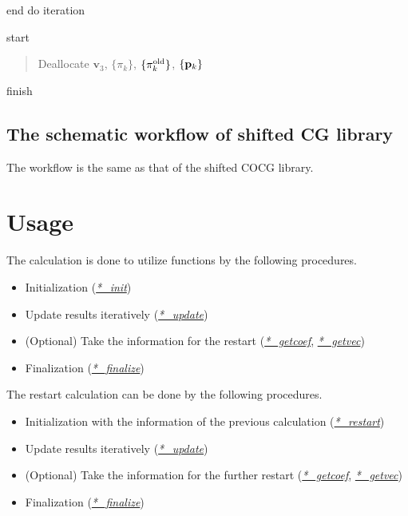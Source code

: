 \documentclass[letterpaper,10pt,dvipdfmx,openany]{sphinxmanual}
\begin{document}
end do iteration

 start
\begin{quote}

Deallocate \({\boldsymbol v}_3\), \(\{\pi_k\}\),
\(\{\pi_k^{\rm old}\}\), \(\{{\bf p}_k\}\)
\end{quote}

 finish


\section{The schematic workflow of shifted CG library}
\label{komega_workflow_en:the-schematic-workflow-of-shifted-cg-library}
The workflow is the same as that of the shifted COCG library.


\chapter{Usage}
\label{komega_usage_en:usage}\label{komega_usage_en::doc}
The calculation is done to utilize functions by the following
procedures.
\begin{itemize}
\item {} 
Initialization ({\hyperref[komega_usage_en:init]{\emph{*\_init}}})

\item {} 
Update results iteratively ({\hyperref[komega_usage_en:update]{\emph{*\_update}}})

\item {} 
(Optional) Take the information for the restart ({\hyperref[komega_usage_en:getcoef]{\emph{*\_getcoef}}}, {\hyperref[komega_usage_en:getvec]{\emph{*\_getvec}}})

\item {} 
Finalization ({\hyperref[komega_usage_en:finalize]{\emph{*\_finalize}}})

\end{itemize}

The restart calculation can be done by the following procedures.
\begin{itemize}
\item {} 
Initialization with the information of the previous calculation ({\hyperref[komega_usage_en:restart]{\emph{*\_restart}}})

\item {} 
Update results iteratively ({\hyperref[komega_usage_en:update]{\emph{*\_update}}})

\item {} 
(Optional) Take the information for the further restart ({\hyperref[komega_usage_en:getcoef]{\emph{*\_getcoef}}}, {\hyperref[komega_usage_en:getvec]{\emph{*\_getvec}}})

\item {} 
Finalization ({\hyperref[komega_usage_en:finalize]{\emph{*\_finalize}}})

\end{itemize}
\end{document}
